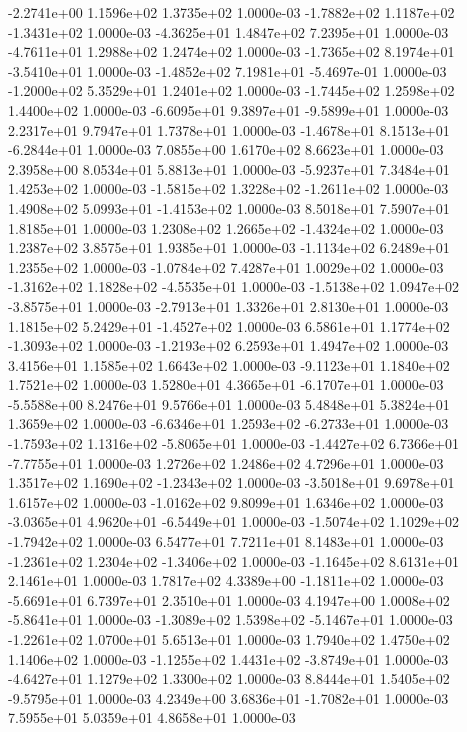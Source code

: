 -2.2741e+00  1.1596e+02  1.3735e+02  1.0000e-03
-1.7882e+02  1.1187e+02 -1.3431e+02  1.0000e-03
-4.3625e+01  1.4847e+02  7.2395e+01  1.0000e-03
-4.7611e+01  1.2988e+02  1.2474e+02  1.0000e-03
-1.7365e+02  8.1974e+01 -3.5410e+01  1.0000e-03
-1.4852e+02  7.1981e+01 -5.4697e-01  1.0000e-03
-1.2000e+02  5.3529e+01  1.2401e+02  1.0000e-03
-1.7445e+02  1.2598e+02  1.4400e+02  1.0000e-03
-6.6095e+01  9.3897e+01 -9.5899e+01  1.0000e-03
2.2317e+01 9.7947e+01 1.7378e+01  1.0000e-03
-1.4678e+01  8.1513e+01 -6.2844e+01  1.0000e-03
7.0855e+00 1.6170e+02 8.6623e+01  1.0000e-03
2.3958e+00 8.0534e+01 5.8813e+01  1.0000e-03
-5.9237e+01  7.3484e+01  1.4253e+02  1.0000e-03
-1.5815e+02  1.3228e+02 -1.2611e+02  1.0000e-03
 1.4908e+02  5.0993e+01 -1.4153e+02  1.0000e-03
8.5018e+01 7.5907e+01 1.8185e+01  1.0000e-03
 1.2308e+02  1.2665e+02 -1.4324e+02  1.0000e-03
1.2387e+02 3.8575e+01 1.9385e+01  1.0000e-03
-1.1134e+02  6.2489e+01  1.2355e+02  1.0000e-03
-1.0784e+02  7.4287e+01  1.0029e+02  1.0000e-03
-1.3162e+02  1.1828e+02 -4.5535e+01  1.0000e-03
-1.5138e+02  1.0947e+02 -3.8575e+01  1.0000e-03
-2.7913e+01  1.3326e+01  2.8130e+01  1.0000e-03
 1.1815e+02  5.2429e+01 -1.4527e+02  1.0000e-03
 6.5861e+01  1.1774e+02 -1.3093e+02  1.0000e-03
-1.2193e+02  6.2593e+01  1.4947e+02  1.0000e-03
3.4156e+01 1.1585e+02 1.6643e+02  1.0000e-03
-9.1123e+01  1.1840e+02  1.7521e+02  1.0000e-03
 1.5280e+01  4.3665e+01 -6.1707e+01  1.0000e-03
-5.5588e+00  8.2476e+01  9.5766e+01  1.0000e-03
5.4848e+01 5.3824e+01 1.3659e+02  1.0000e-03
-6.6346e+01  1.2593e+02 -6.2733e+01  1.0000e-03
-1.7593e+02  1.1316e+02 -5.8065e+01  1.0000e-03
-1.4427e+02  6.7366e+01 -7.7755e+01  1.0000e-03
1.2726e+02 1.2486e+02 4.7296e+01  1.0000e-03
 1.3517e+02  1.1690e+02 -1.2343e+02  1.0000e-03
-3.5018e+01  9.6978e+01  1.6157e+02  1.0000e-03
-1.0162e+02  9.8099e+01  1.6346e+02  1.0000e-03
-3.0365e+01  4.9620e+01 -6.5449e+01  1.0000e-03
-1.5074e+02  1.1029e+02 -1.7942e+02  1.0000e-03
6.5477e+01 7.7211e+01 8.1483e+01  1.0000e-03
-1.2361e+02  1.2304e+02 -1.3406e+02  1.0000e-03
-1.1645e+02  8.6131e+01  2.1461e+01  1.0000e-03
 1.7817e+02  4.3389e+00 -1.1811e+02  1.0000e-03
-5.6691e+01  6.7397e+01  2.3510e+01  1.0000e-03
 4.1947e+00  1.0008e+02 -5.8641e+01  1.0000e-03
-1.3089e+02  1.5398e+02 -5.1467e+01  1.0000e-03
-1.2261e+02  1.0700e+01  5.6513e+01  1.0000e-03
1.7940e+02 1.4750e+02 1.1406e+02  1.0000e-03
-1.1255e+02  1.4431e+02 -3.8749e+01  1.0000e-03
-4.6427e+01  1.1279e+02  1.3300e+02  1.0000e-03
 8.8444e+01  1.5405e+02 -9.5795e+01  1.0000e-03
 4.2349e+00  3.6836e+01 -1.7082e+01  1.0000e-03
7.5955e+01 5.0359e+01 4.8658e+01  1.0000e-03
